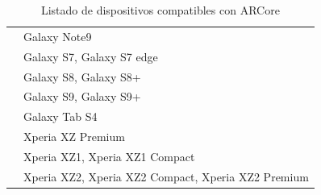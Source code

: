 \begin{table}[]
\begin{tabular}{| p{4.5cm} | p{10.5cm} |}
		& Galaxy Note9                                       \\ \cline{2-2} 
		& Galaxy S7, Galaxy S7 edge                          \\ \cline{2-2} 
		& Galaxy S8, Galaxy S8+                              \\ \cline{2-2} 
		& Galaxy S9, Galaxy S9+                              \\ \cline{2-2} 
		& Galaxy Tab S4                                      \\ \hline  \centering
		\multirow{3}{*}{Sony}       & Xperia XZ Premium                                  \\ \cline{2-2} 
		& Xperia XZ1, Xperia XZ1 Compact                     \\ \cline{2-2} 
		& Xperia XZ2, Xperia XZ2 Compact, Xperia XZ2 Premium \\ \hline
	\end{tabular}

\captionsetup{justification=centering}
\caption{Listado de dispositivos compatibles con ARCore}
\end{table}
